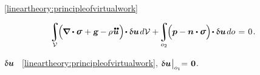 \vspace{-0.4em}\noindent
{}~\eqref{lineartheory:principleofvirtualwork}

\nopagebreak\vspace{-0.4em}
\begin{equation*}
\displaystyle\integral\displaylimits_{\mathcal{V}} \hspace{-0.4ex} \Bigl( \hspace{-0.1ex} \boldnabla \dotp \linearstress \hspace{.1ex} + \volumeloadvector \hspace{-0.1ex} - \hspace{-0.1ex} \massdensity \hspace{.1ex} \mathdotdotabove{\bm{u}} \hspace{.1ex} \Bigr) \hspace{-0.3ex} \dotp \variation{\bm{u}} \hspace{.25ex} d\mathcal{V}
+ \hspace{-0.3ex}
\displaystyle\integral\displaylimits_{o_2} \hspace{-0.4ex} \Bigl( \bm{p} - \unitnormalvector \dotp \linearstress \Bigr) \hspace{-0.3ex} \dotp \variation{\bm{u}} \hspace{.25ex} do
\hspace{.2ex} = \hspace{.2ex} 0
\hspace{.2ex} .
\end{equation*}

\vspace{-0.4em}\noindent
{}\en{,}
~$\updelta\hspace{-0.1ex}\bm{u}$
~\eqref{lineartheory:principleofvirtualwork},
${ \updelta\hspace{-0.1ex}\bm{u} \hspace{.1ex} \bigr|_{o_1} \hspace{-0.64ex} = \hspace{.2ex} {\bm{0}} }$.
